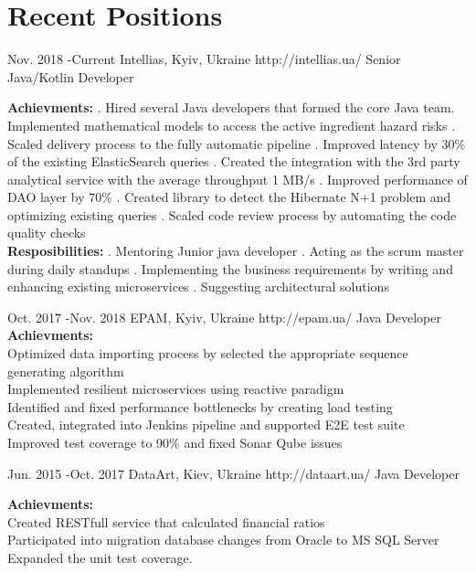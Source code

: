 \documentclass[10pt]{article} %
\begin{document}
\section{Recent Positions}
\job
{Nov. 2018 -}{Current}
{Intellias, Kyiv, Ukraine}
{http://intellias.ua/}
{Senior Java/Kotlin Developer}
{
\rule{0mm}{5mm}
\textbf{Achievments:} . Hired several Java developers that formed the core Java team. Implemented mathematical models to access the active ingredient hazard risks . Scaled delivery process to the fully automatic pipeline . Improved latency by 30\% of the existing ElasticSearch queries . Created the integration with the 3rd party analytical service with the average throughput 1 MB/s . Improved performance of DAO layer by 70\%  . Created library to detect the Hibernate N+1 problem and optimizing existing queries . Scaled code review process by automating the code quality checks 
\\ \textbf{Resposibilities:} . Mentoring Junior java developer . Acting as the scrum master during daily standups . Implementing the business requirements by writing and enhancing existing microservices . Suggesting architectural solutions
 }
 
\job
{Oct. 2017 -}{Nov. 2018}
{EPAM, Kyiv, Ukraine}
{http://epam.ua/}
{Java Developer}
{
\textbf{Achievments:}  
\\Optimized data importing process by selected the appropriate sequence generating algorithm
\\Implemented resilient microservices using reactive paradigm
\\Identified and fixed performance bottlenecks by creating load testing 
\\Created, integrated into Jenkins pipeline and supported E2E test suite
\\Improved test coverage to 90\% and fixed Sonar Qube issues
 }

\job
{Jun. 2015 -}{Oct. 2017}
{DataArt, Kiev, Ukraine}
{http://dataart.ua/}
{Java Developer}
{

\textbf{Achievments:}  
\\Created RESTfull service that calculated financial ratios
\\Participated into migration database changes from Oracle to MS SQL Server
\\Expanded the unit test coverage.
 }
\end{document}
